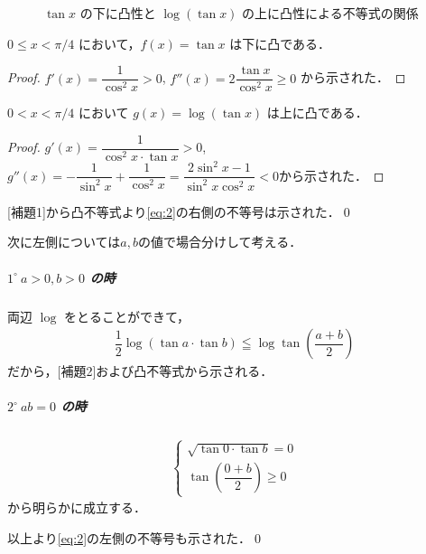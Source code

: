 \documentclass[../../main.tex]{subfiles}
\begin{document}
\begin{figure}[htb]
  \caption{$\tan x$ の下に凸性と $\log(\tan x)$ の上に凸性による不等式の関係}
  \label{fig:convexity}
\end{figure}

\begin{lemma}[補題1]
  $0 \le x < \pi/4$ において，$f(x) = \tan x$ は下に凸である．
\end{lemma}

\begin{proof}
  $f'(x) = \dfrac{1}{\cos^2 x} > 0$, $f''(x) = 2 \dfrac{\tan x}{\cos^2 x} \ge 0$ から示された．
\end{proof}

\begin{lemma}[補題2]
  $0 < x < \pi/4$ において $g(x) = \log(\tan x)$ は上に凸である．
\end{lemma}

\begin{proof}
  $g'(x) = \dfrac{1}{\cos^2 x \cdot \tan x} > 0$, $g''(x) = - \dfrac{1}{\sin^2 x} + \dfrac{1}{\cos^2 x} = \dfrac{2\sin^2 x - 1}{\sin^2 x \cos^2 x} < 0$から示された．
\end{proof}

[補題1]から凸不等式より\cref{eq:2}の右側の不等号は示された．\qed

次に左側については$a,b$の値で場合分けして考える．

\subparagraph{$1^\circ \ a>0, b>0$ の時}

両辺 $\log$ をとることができて，
\begin{align}
  \dfrac{1}{2} \log\left(\tan a \cdot \tan b\right)
  \leqq \log \tan \left( \dfrac{a+b}{2} \right)
\end{align}
だから，[補題2]および凸不等式から示される．

\subparagraph{$2^\circ \ ab=0$ の時}

\begin{align}
  \begin{cases}
    \sqrt{\tan 0 \cdot \tan b} = 0 \\
    \tan\left(\dfrac{0+b}{2}\right) \ge 0
  \end{cases}
\end{align}
から明らかに成立する．
\casesend

以上より\cref{eq:2}の左側の不等号も示された．\qed
\end{document}
